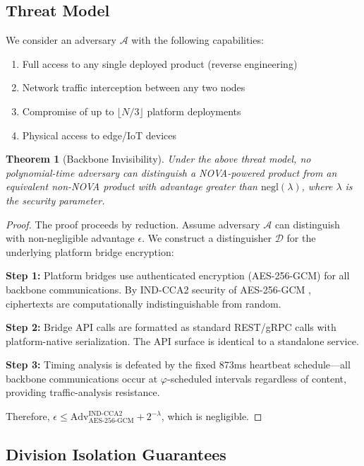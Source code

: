 \documentclass[12pt]{article}
\newtheorem{theorem}{Theorem}
\newcommand{\PHI}{\varphi}
\begin{document}
\subsection{Threat Model}

We consider an adversary $\mathcal{A}$ with the following capabilities:
\begin{enumerate}
    \item Full access to any single deployed product (reverse engineering)
    \item Network traffic interception between any two nodes
    \item Compromise of up to $\lfloor N/3 \rfloor$ platform deployments
    \item Physical access to edge/IoT devices
\end{enumerate}

\begin{theorem}[Backbone Invisibility]
Under the above threat model, no polynomial-time adversary can distinguish a NOVA-powered product from an equivalent non-NOVA product with advantage greater than $\text{negl}(\lambda)$, where $\lambda$ is the security parameter.
\end{theorem}

\begin{proof}
The proof proceeds by reduction. Assume adversary $\mathcal{A}$ can distinguish with non-negligible advantage $\epsilon$. We construct a distinguisher $\mathcal{D}$ for the underlying platform bridge encryption:

\textbf{Step 1:} Platform bridges use authenticated encryption (AES-256-GCM) for all backbone communications. By IND-CCA2 security of AES-256-GCM \cite{mcgrew2004security}, ciphertexts are computationally indistinguishable from random.

\textbf{Step 2:} Bridge API calls are formatted as standard REST/gRPC calls with platform-native serialization. The API surface is identical to a standalone service.

\textbf{Step 3:} Timing analysis is defeated by the fixed 873ms heartbeat schedule—all backbone communications occur at $\PHI$-scheduled intervals regardless of content, providing traffic-analysis resistance.

Therefore, $\epsilon \leq \text{Adv}^{\text{IND-CCA2}}_{\text{AES-256-GCM}} + 2^{-\lambda}$, which is negligible.
\end{proof}

\subsection{Division Isolation Guarantees}
\end{document}
